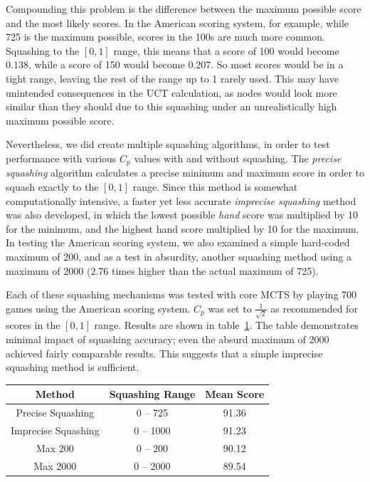 \documentclass[letterpaper]{article}
\begin{document}
Compounding this problem is the difference between the maximum possible score and the most likely scores. In the American scoring system, for example, while 725 is the maximum possible, scores in the 100s are much more common. Squashing to the $[0,1]$ range, this means that a score of 100 would become $0.138$, while a score of 150 would become $0.207$. So most scores would be in a tight range, leaving the rest of the range up to 1 rarely used. This may have unintended consequences in the UCT calculation, as nodes would look more similar than they should due to this squashing under an unrealistically high maximum possible score.

Nevertheless, we did create multiple squashing algorithms, in order to test performance with various $C_p$ values with and without squashing. The {\it precise squashing} algorithm calculates a precise minimum and maximum score in order to squash exactly to the $[0,1]$ range. Since this method is somewhat computationally intensive, a faster yet less accurate {\it imprecise squashing} method was also developed, in which the lowest possible {\it hand} score was multiplied by 10 for the minimum, and the highest hand score multiplied by 10 for the maximum. In testing the American scoring system, we also examined a simple hard-coded maximum of 200, and as a test in absurdity, another squashing method using a maximum of 2000 (2.76 times higher than the actual maximum of 725).

Each of these squashing mechanisms was tested with core MCTS by playing 700 games using the American scoring system. $C_p$ was set to $\frac{1}{\sqrt{2}}$ as recommended for scores in the $[0,1]$ range. Results are shown in table~\ref{tbl:Squashing}. The table demonstrates minimal impact of squashing accuracy; even the absurd maximum of 2000 achieved fairly comparable results. This suggests that a simple imprecise squashing method is sufficient.

\begin{table}
\label{tbl:Squashing}
\centering
\begin{tabular}{c c c}
\hline
Method & Squashing Range & Mean Score \\
\hline
Precise Squashing & 0 -- 725 & 91.36 \\
Imprecise Squashing & 0 -- 1000 & 91.23 \\
Max 200 & 0 -- 200 & 90.12 \\
Max 2000 & 0 -- 2000 & 89.54 \\
\hline
\end{tabular}
\end{table}
\end{document}
